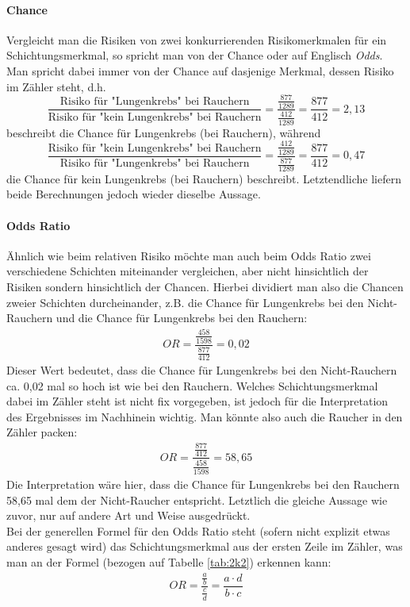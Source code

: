 \documentclass[a4paper]{article}
\newcommand\dangersign{%
 \makebox[1.8em][c]{%
 \makebox[0pt][c]{\raisebox{.15em}{\small!}}%
 \makebox[0pt][c]{\color{red}\Large$\triangle$}}}%
\begin{document}
\paragraph{Chance} Vergleicht man die Risiken von zwei konkurrierenden Risikomerkmalen für ein Schichtungsmerkmal, so spricht man von der Chance oder auf Englisch \textit{Odds}. Man spricht dabei immer von der Chance auf dasjenige Merkmal, dessen Risiko im Zähler steht, d.h. $$\frac{\mbox{Risiko für "Lungenkrebs" bei Rauchern}}{\mbox{Risiko für "kein Lungenkrebs" bei Rauchern}} = \dfrac{\frac{877}{1289}}{\frac{412}{1289}} = \dfrac{877}{412} = 2,13$$
beschreibt die Chance für Lungenkrebs (bei Rauchern), während
$$\frac{\mbox{Risiko für "kein Lungenkrebs" bei Rauchern}}{\mbox{Risiko für "Lungenkrebs" bei Rauchern}} = \dfrac{\frac{412}{1289}}{\frac{877}{1289}} = \dfrac{877}{412} = 0,47$$
die Chance für kein Lungenkrebs (bei Rauchern) beschreibt. Letztendliche liefern beide Berechnungen jedoch wieder dieselbe Aussage.

\paragraph{Odds Ratio} Ähnlich wie beim relativen Risiko möchte man auch beim Odds Ratio zwei verschiedene Schichten miteinander vergleichen, aber nicht hinsichtlich der Risiken sondern hinsichtlich der Chancen. Hierbei dividiert man also die Chancen zweier Schichten durcheinander, z.B. die Chance für Lungenkrebs bei den Nicht-Rauchern und die Chance für Lungenkrebs bei den Rauchern:
\begin{align*}
    OR = \dfrac{\frac{458}{1598}}{\frac{877}{412}} = 0,02
\end{align*}
Dieser Wert bedeutet, dass die Chance für Lungenkrebs bei den Nicht-Rauchern ca. 0,02 mal so hoch ist wie bei den Rauchern. Welches Schichtungsmerkmal dabei im Zähler steht ist nicht fix vorgegeben, ist jedoch für die Interpretation des Ergebnisses im Nachhinein wichtig. Man könnte also auch die Raucher in den Zähler packen: 
\begin{align*}
    OR = \dfrac{\frac{877}{412}}{\frac{458}{1598}} = 58,65
\end{align*}
Die Interpretation wäre hier, dass die Chance für Lungenkrebs bei den Rauchern 58,65 mal dem der Nicht-Raucher entspricht. Letztlich die gleiche Aussage wie zuvor, nur auf andere Art und Weise ausgedrückt.\\

\noindent \dangersign Bei der generellen Formel für den Odds Ratio steht (sofern nicht explizit etwas anderes gesagt wird) das Schichtungsmerkmal aus der ersten Zeile im Zähler, was man an der Formel (bezogen auf Tabelle \ref{tab:2k2}) erkennen kann:
\begin{align*}
    OR = \dfrac{\frac{a}{b}}{\frac{c}{d}} = \dfrac{a \cdot d}{b \cdot c}
\end{align*}\\
\end{document}
